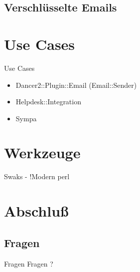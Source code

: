 \subsection{Verschlüsselte Emails}

\section{Use Cases}

\begin{frame}{Use Cases}
  \begin{itemize}
  \item Dancer2::Plugin::Email (Email::Sender)
  \item Helpdesk::Integration
  \item Sympa
  \end{itemize}
\end{frame}

\section{Werkzeuge}

Swaks - !Modern perl

\section{Abschluß}

\subsection{Fragen}

\begin{frame}{Fragen}
\centering
Fragen ?
\end{frame}



